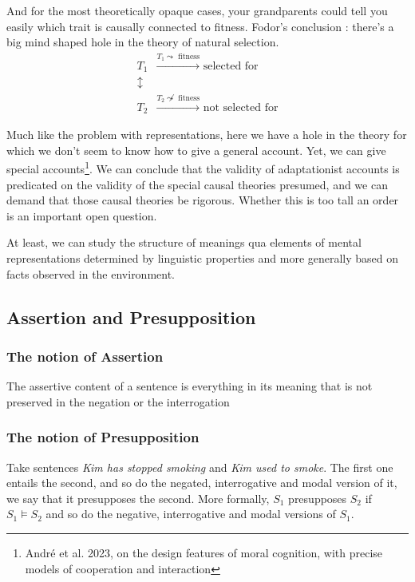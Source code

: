 \documentclass{cours}
\begin{document}
And for the most theoretically opaque cases, your grandparents could tell you easily which trait is causally connected to fitness. Fodor's conclusion\! : there's a big mind shaped hole in the theory of natural selection.
\[
    \begin{aligned}
        T_{1}        & \xrightarrow{T_{1} \leadsto \text{ fitness}} \text{ selected for}         \\
        \updownarrow &                                                                           \\
        T_{2}        & \xrightarrow{T_{2} \not\leadsto \text{ fitness}} \text{ not selected for}
    \end{aligned}
\]

Much like the problem with representations, here we have a hole in the theory for which we don't seem to know how to give a general account. Yet, we can give special accounts\footnote{André et al. 2023, on the design features of moral cognition, with precise models of cooperation and interaction}. We can conclude that the validity of adaptationist accounts is predicated on the validity of the special causal theories presumed, and we can demand that those causal theories be rigorous. Whether this is too tall an order is an important open question.

At least, we can study the structure of meanings qua elements of mental representations determined by linguistic properties and more generally based on facts observed in the environment.

\subsection{Assertion and Presupposition}
\subsubsection{The notion of Assertion}
The assertive content of a sentence is everything in its meaning that is not preserved in the negation or the interrogation

\subsubsection{The notion of Presupposition}
Take sentences \textsl{Kim has stopped smoking} and \textsl{Kim used to smoke}. The first one entails the second, and so do the negated, interrogative and modal version of it, we say that it presupposes the second.
More formally, $S_{1}$ presupposes $S_{2}$ if $S_{1} \vDash S_{2}$ and so do the negative, interrogative and modal versions of $S_{1}$.
\end{document}

